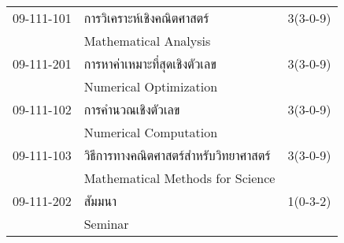 \begin{longtable}{p{}p{}r{}}
09-111-101 & การวิเคราะห์เชิงคณิตศาสตร์ & 3(3-0-9)\\
 & Mathematical Analysis & \\[3mm]
09-111-201 & การหาค่าเหมาะที่สุดเชิงตัวเลข & 3(3-0-9)\\
 & Numerical Optimization & \\[3mm]
09-111-102 & การคำนวณเชิงตัวเลข & 3(3-0-9)\\
 & Numerical Computation & \\[3mm]
09-111-103 & วิธีการทางคณิตศาสตร์สำหรับวิทยาศาสตร์ & 3(3-0-9)\\
 & Mathematical Methods for Science & \\[3mm]
09-111-202 & สัมมนา & 1(0-3-2)\\
 & Seminar & \\[3mm]
\end{longtable}
